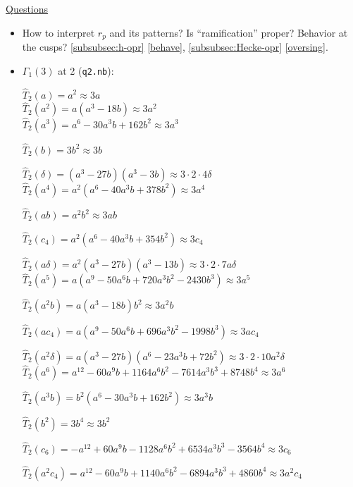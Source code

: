 \documentclass{rs}
\theoremstyle{definition}
\theoremstyle{remark}
\renewcommand{\d}{\delta}
\newcommand{\G}{\Gamma}
\newcommand{\Ht}{\widehat{T}}
\renewcommand{\=}{\approx}
\renewcommand{\-}{\sim}
\numberwithin{equation}{section}
\numberwithin{thm}{section}
\begin{document}
\underline{Questions} 
\begin{itemize}
 \item How to interpret $r_p$ and its patterns?  Is ``ramification'' proper?  
 Behavior at the cusps?  \ref{subsubsec:h-opr} \eqref{behave}, \ref{subsubsec:Hecke-opr} \eqref{oversing}.  
\end{itemize}
 
\begin{itemize}
 \item $\G_1(3)$ at 2 (\texttt{q2.nb}): 

 $\Ht_2(a) = a^2 \= 3 a$ \\

 $\Ht_2(a^2) = a (a^3 - 18 b) \= 3 a^2$ \\

 $\Ht_2(a^3) = a^6 - 30 a^3 b + 162 b^2 \= 3 a^3$ 

 $\Ht_2(b) = 3 b^2 \= 3 b$ 

 $\Ht_2(\d) = (a^3 - 27 b) (a^3 - 3 b) \= 3 \cdot 2 \cdot 4 \d$ \\

 $\Ht_2(a^4) = a^2 (a^6 - 40 a^3 b + 378 b^2) \= 3 a^4$ 

 $\Ht_2(a b) = a^2 b^2 \= 3 a b$ 

 $\Ht_2(c_4) = a^2 (a^6 - 40 a^3 b + 354 b^2) \= 3 c_4$ 

 $\Ht_2(a \d) = a^2 (a^3 - 27 b) (a^3 - 13 b) \= 3 \cdot 2 \cdot 7 a \d$ \\

 $\Ht_2(a^5) = a (a^9 - 50 a^6 b + 720 a^3 b^2 - 2430 b^3) \= 3 a^5$ 

 $\Ht_2(a^2 b) = a (a^3 - 18 b) b^2 \= 3 a^2 b$ 

 $\Ht_2(a c_4) = a (a^9 - 50 a^6 b + 696 a^3 b^2 - 1998 b^3) \= 3 a c_4$ 

 $\Ht_2(a^2 \d) = a (a^3 - 27 b) (a^6 - 23 a^3 b + 72 b^2) \= 3 \cdot 2 \cdot 10 a^2 \d$ \\

 $\Ht_2(a^6) = a^{12} - 60 a^9 b + 1164 a^6 b^2 - 7614 a^3 b^3 + 8748 b^4 \= 3 a^6$ 

 $\Ht_2(a^3 b) = b^2 (a^6 - 30 a^3 b + 162 b^2) \= 3 a^3 b$ 

 $\Ht_2(b^2) = 3 b^4 \= 3 b^2$ 

 $\Ht_2(c_6) = -a^{12} + 60 a^9 b - 1128 a^6 b^2 + 6534 a^3 b^3 - 3564 b^4 \= 3 c_6$ 

 $\Ht_2(a^2 c_4) = a^{12} - 60 a^9 b + 1140 a^6 b^2 - 6894 a^3 b^3 + 4860 b^4 \= 3 a^2 c_4$ 


\end{itemize}
\end{document}
